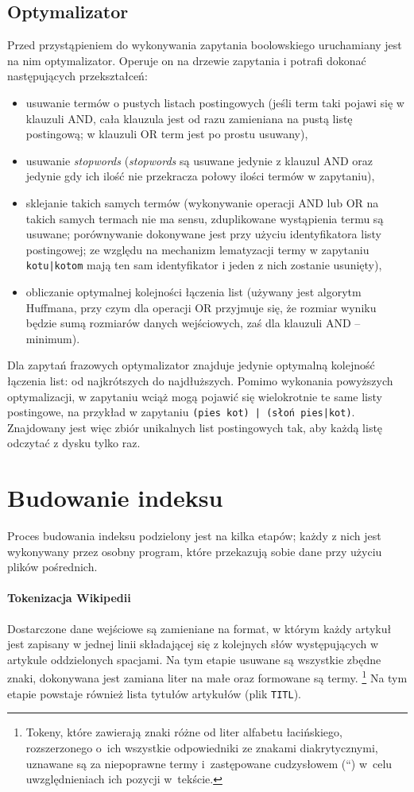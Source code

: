 \documentclass[a4paper,12pt]{article}
\begin{document}
\subsection{Optymalizator}
Przed przystąpieniem do wykonywania zapytania boolowskiego uruchamiany jest
na nim optymalizator. Operuje on na drzewie zapytania i potrafi dokonać
następujących przekształceń:
\begin{itemize}
 \item usuwanie termów o pustych listach postingowych (jeśli term taki
 pojawi się w klauzuli AND, cała klauzula jest od razu zamieniana na
 pustą listę postingową; w klauzuli OR term jest po prostu usuwany),
 \item usuwanie \textit{stopwords} (\textit{stopwords} są usuwane jedynie
 z klauzul AND oraz jedynie gdy ich ilość nie przekracza połowy ilości
 termów w zapytaniu),
 \item sklejanie takich samych termów (wykonywanie operacji AND lub
 OR na takich samych termach nie ma sensu, zduplikowane wystąpienia 
 termu są usuwane; porównywanie dokonywane jest przy użyciu identyfikatora
 listy postingowej; ze względu na mechanizm lematyzacji termy w zapytaniu
 \texttt{kotu|kotom} mają ten sam identyfikator i jeden z nich zostanie
 usunięty),
 \item obliczanie optymalnej kolejności łączenia list (używany jest
 algorytm Huffmana, przy czym dla operacji OR przyjmuje się, że
 rozmiar wyniku będzie sumą rozmiarów danych wejściowych, zaś dla
 klauzuli AND -- minimum).
\end{itemize}
Dla zapytań frazowych optymalizator znajduje jedynie optymalną kolejność
łączenia list: od najkrótszych do najdłuższych.
Pomimo wykonania powyższych optymalizacji, w zapytaniu wciąż mogą pojawić
się wielokrotnie te same listy postingowe, na przykład w zapytaniu
\texttt{(pies kot) | (słoń pies|kot)}. Znajdowany jest więc zbiór
unikalnych list postingowych tak, aby każdą listę odczytać z dysku
tylko raz.

\section{Budowanie indeksu}
Proces budowania indeksu podzielony jest na kilka etapów; każdy z nich jest
wykonywany przez osobny program, które przekazują sobie dane przy użyciu plików
pośrednich.

\paragraph{Tokenizacja Wikipedii} Dostarczone dane wejściowe są zamieniane
na format, w którym każdy artykuł jest zapisany w jednej linii składającej się
z kolejnych słów występujących w artykule oddzielonych spacjami. Na tym etapie
usuwane są wszystkie zbędne znaki, dokonywana jest zamiana liter na małe
oraz formowane są termy.
\footnote{Tokeny, które zawierają znaki różne od liter alfabetu łacińskiego,
rozszerzonego o~ich wszystkie odpowiedniki ze znakami diakrytycznymi, uznawane
są za niepoprawne termy i~zastępowane cudzysłowem (``) w~celu uwzględnieniach
ich pozycji w~tekście.}
Na tym etapie powstaje również lista tytułów
artykułów (plik \texttt{TITL}).
\end{document}
